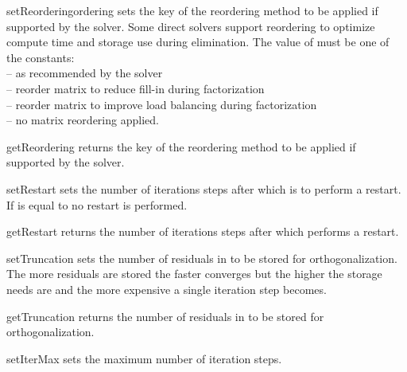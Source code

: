 \begin{methoddesc}[SolverOptions]{setReordering}{ordering}
sets the key of the reordering method to be applied if supported by the solver.
Some direct solvers support reordering to optimize compute time and storage
use during elimination. The value of  must be one of the
constants:\\
  -- as recommended by the solver\\
  -- reorder matrix to reduce fill-in during factorization\\
  -- reorder matrix to improve load balancing during factorization\\
  -- no matrix reordering applied.
\end{methoddesc}

\begin{methoddesc}[SolverOptions]{getReordering}{}
returns the key of the reordering method to be applied if supported by the solver.
\end{methoddesc}

\begin{methoddesc}[SolverOptions]{setRestart}{}
sets the number of iterations steps after which \GMRES is to perform a restart.
If  is equal to  no restart is performed.
\end{methoddesc}

\begin{methoddesc}[SolverOptions]{getRestart}{}
returns the number of iterations steps after which \GMRES performs a restart.
\end{methoddesc}

\begin{methoddesc}[SolverOptions]{setTruncation}{}
sets the number of residuals in \GMRES to be stored for orthogonalization. 
The more residuals are stored the faster \GMRES converges but the higher the storage needs are and the more expensive
a single iteration step becomes.
\end{methoddesc}

\begin{methoddesc}[SolverOptions]{getTruncation}{}
returns the number of residuals in \GMRES to be stored for orthogonalization.
\end{methoddesc}


\begin{methoddesc}[SolverOptions]{setIterMax}{}
sets the maximum number of iteration steps.
\end{methoddesc}


